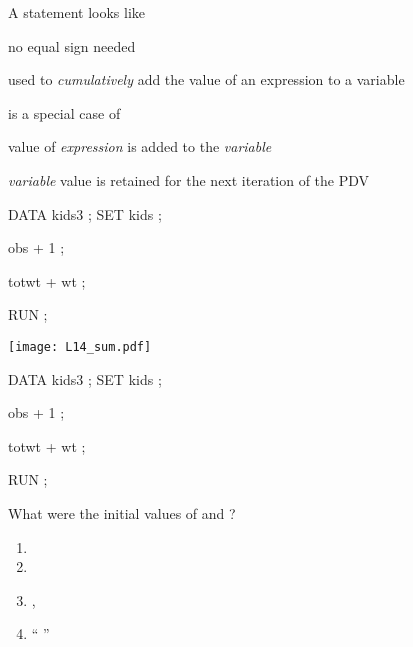 \begin{frame}
\bi
\item A  statement looks like
\item[] 
\item[] no equal sign needed
\item used to \emph{cumulatively} add the value of an expression to a variable
\item {} is a special case of 
\bi
\item value of \emph{expression} is added to the \emph{variable}
\item \emph{variable} value is retained for the next iteration of the PDV
\ei
\ei
\end{frame}


\begin{frame}[fragile]
\footnotesize
\begin{code}{.0}
DATA kids3 ;
   SET kids ;
   
   obs + 1 ;
   
   totwt + wt ;

RUN ;
\end{code}
\emp
{} \hspace{0.05in} \emp
{}
\texttt{[image: L14\_sum.pdf]}
\emp
\end{frame}

\begin{frame}[fragile]
\footnotesize
\begin{code}{.0}
DATA kids3 ;
   SET kids ;

   obs + 1 ;

   totwt + wt ;

RUN ;
\end{code}
\emp
{} \hspace{0.05in} \emp
{}
\begin{clicker}{What were the initial values of  and ?}
\begin{enumerate}
\item {}
\item {}
\item {}, 
\item ``  ''
\end{enumerate}
\end{clicker}
\emp
\end{frame}


